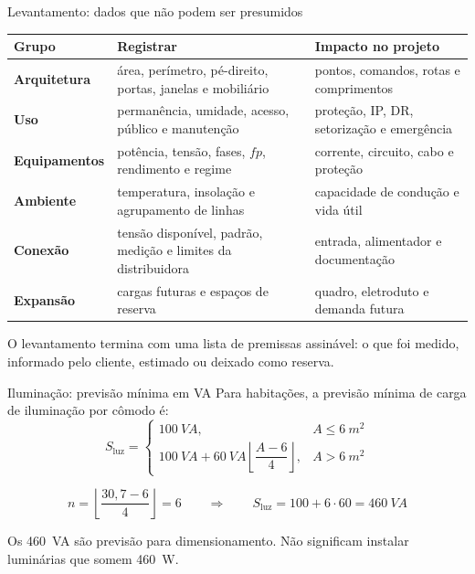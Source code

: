 \begin{frame}{Levantamento: dados que não podem ser presumidos}
\scriptsize
\begin{tabularx}{\textwidth}{>{\bfseries}p{2.6cm}X X}
\toprule
Grupo & Registrar & Impacto no projeto \\
\midrule
Arquitetura & área, perímetro, pé-direito, portas, janelas e mobiliário & pontos, comandos, rotas e comprimentos \\
Uso & permanência, umidade, acesso, público e manutenção & proteção, IP, DR, setorização e emergência \\
Equipamentos & potência, tensão, fases, $fp$, rendimento e regime & corrente, circuito, cabo e proteção \\
Ambiente & temperatura, insolação e agrupamento de linhas & capacidade de condução e vida útil \\
Conexão & tensão disponível, padrão, medição e limites da distribuidora & entrada, alimentador e documentação \\
Expansão & cargas futuras e espaços de reserva & quadro, eletroduto e demanda futura \\
\bottomrule
\end{tabularx}
\vspace{2mm}
\begin{caixaObs}
O levantamento termina com uma lista de premissas assinável: o que foi medido, informado pelo cliente, estimado ou deixado como reserva.
\end{caixaObs}
\end{frame}

\begin{frame}{Iluminação: previsão mínima em VA}
\small
Para habitações, a previsão mínima de carga de iluminação por cômodo é:
\[
S_{\mathrm{luz}}=
\begin{cases}
\SI{100}{VA}, & A\leq \SI{6}{m^2}\\[1mm]
\SI{100}{VA}+\SI{60}{VA}\left\lfloor\dfrac{A-6}{4}\right\rfloor,
& A>\SI{6}{m^2}
\end{cases}
\]
\begin{caixaEx}[title={Sala/jantar de 30,7 m²}]
\[
n=\left\lfloor\frac{30{,}7-6}{4}\right\rfloor=6
\qquad\Rightarrow\qquad
S_{\mathrm{luz}}=100+6\cdot60=\SI{460}{VA}
\]
\end{caixaEx}
\begin{caixaAt}
Os \SI{460}{VA} são previsão para dimensionamento. Não significam instalar luminárias que somem \SI{460}{W}.
\end{caixaAt}
\end{frame}

